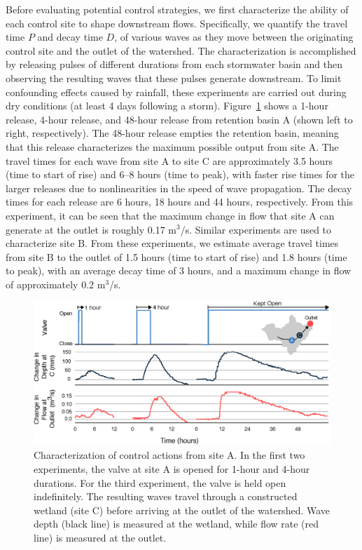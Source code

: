 Before evaluating potential control strategies, we first characterize the ability of each control site to shape downstream flows. Specifically, we quantify the travel time $P$ and decay time $D$, of various waves as they move between the originating control site and the outlet of the watershed. The characterization is accomplished by releasing pulses of different durations 
from each stormwater basin and then observing the resulting waves that these pulses generate downstream. To limit confounding effects caused by rainfall, these experiments are carried out during dry conditions (at least 4 days following a storm). Figure~\ref{fig-ch2:3} shows a 1-hour release, 4-hour release, and 48-hour release from retention basin A (shown left to right, respectively). The 48-hour release empties the retention basin, meaning that this release characterizes the maximum possible output from site A. The travel times for each wave from site A to site C are approximately 3.5 hours (time to start of rise) and 6--8 hours (time to peak), with faster rise times for the larger releases due to nonlinearities in the speed of wave propagation. The decay times for each release are 6 hours, 18 hours and 44 hours, respectively. From this experiment, it can be seen that the maximum change in flow that site A can generate at the outlet is roughly 0.17 m$^3$/s.
Similar experiments are used to characterize site B. From these experiments, we estimate average travel times from site B to the outlet of 1.5 hours (time to start of rise) and 1.8 hours (time to peak), with an average decay time of 3 hours, and a maximum change in flow of approximately 0.2 m$^3$/s.

\begin{figure}
    \centering
    \includegraphics[width=\textwidth]{gfx/Chapter-2/fod.eps}
    \caption{Characterization of
    control actions from site A. In the first two experiments,
    the valve at site A is opened for 1-hour and 4-hour durations. For the third experiment, the valve is held open indefinitely.
    The resulting waves travel through
    a constructed wetland (site C) %
    before arriving at the outlet of the watershed. Wave depth (black line) is measured at the wetland, while flow rate (red line) is measured at the outlet.}\label{fig-ch2:3}
\end{figure}

